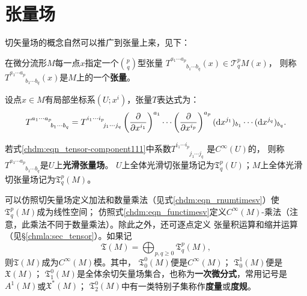 \section{张量场}\label{chdm:sec_tensor-fields}
切矢量场的概念自然可以推广到张量上来，见下：
\begin{definition}\label{chdm:def_tensor-field}
    在微分流形$M$每一点$x$指定一个$\binom{p}{q}$型张量
    $T^{a_1\cdots a_p}_{\phantom{a_1 \cdots a_p}b_1\cdots b_q}(x)\in \mathcal{T}^{p}_{q} M (x)$，
    则称$T^{a_1\cdots a_p}_{\phantom{a_1 \cdots a_p}b_1\cdots b_q}(x)$是$M$上的一个\textbf{张量}。
\end{definition}
设点$x\in M$有局部坐标系$(U;x^i)$，张量$T$表达式为：
\begin{equation}\label{chdm:eqn_tensor-component111}
    T^{a_1 \cdots a_p}_{\phantom{a_1 \cdots a_p}b_1\cdots b_q} 
    = T^{i_1 \cdots i_p}_{\phantom{i_1 \cdots i_p}j_1\cdots j_q} 
    \left(\frac{\partial }{\partial x^{i_1}}\right)^{a_1} \cdots 
    \left(\frac{\partial }{\partial x^{i_p}}\right)^{a_p} 
    ({\rm d}x^{j_1})_{b_1} \cdots  ({\rm d}x^{j_q})_{b_q}    .
\end{equation}
\begin{definition}
    若式\eqref{chdm:eqn_tensor-component111}中系数$T^{i_1 \cdots i_p}_{\phantom{i_1 \cdots i_p}j_1\cdots j_q}$
    是$C^\infty(U)$的，
    则称$T^{a_1\cdots a_p}_{\phantom{a_1 \cdots a_p}b_1\cdots b_q}$是$U$上\textbf{光滑张量场}。
    $U$上全体光滑切张量场记为$\mathfrak{T}^p_q(U)$；$M$上全体光滑切张量场记为$\mathfrak{T}^p_q(M)$。
\end{definition}
可以仿照切矢量场定义加法和数量乘法（见式\eqref{chdm:eqn_rnumtimesv}）使$\mathfrak{T}^p_q(M)$成为线性空间；
仿照式\eqref{chdm:eqn_functimesv}定义$C^\infty(M)$-乘法（注意，此乘法不同于数量乘法）。除此之外，还可逐点定义
张量积运算和缩并运算（见\S \ref{chmla:sec_tensor}）。如果记
\begin{equation}
    \mathfrak{T}(M) = \bigoplus_{p,q \geqslant 0} \mathfrak{T}^p_q(M),
\end{equation}
则$\mathfrak{T}(M)$成为$C^\infty(M)$模。其中，
$\mathfrak{T}^{0}_{0}(M)$便是$C^\infty(M)$；
$\mathfrak{T}^{1}_{0}(M)$便是$\mathfrak{X}(M)$；
$\mathfrak{T}^{0}_{1}(M)$是全体余切矢量场集合，也称为\textbf{一次微分式}，常用记号是${A}^{1}(M)$或$\mathfrak{X}^*(M)$；
$\mathfrak{T}^{0}_{2}(M)$中有一类特别子集称作\textbf{度量}或\textbf{度规}。


